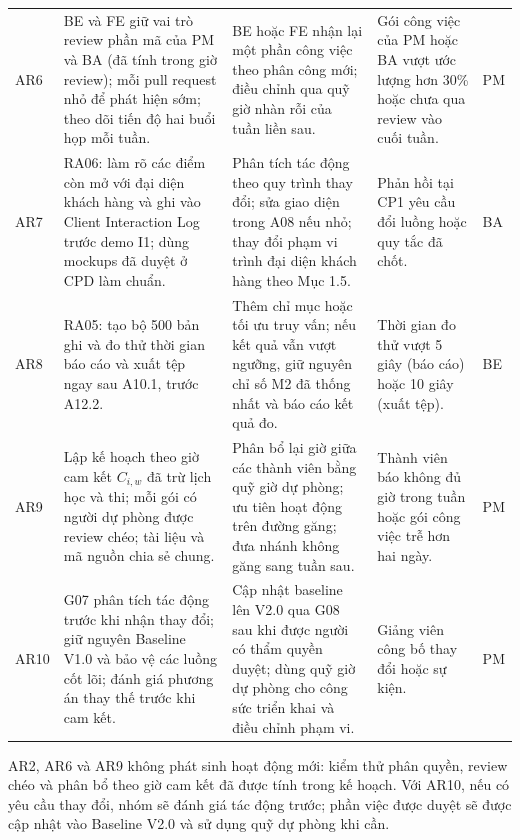 {\begin{longtable}{@{}Y{1.0cm}Y{4.1cm}Y{4.2cm}Y{3.1cm}Y{1.3cm}@{}}
\addlinespace
AR6 &
BE và FE giữ vai trò review phần mã của PM và BA (đã tính trong giờ review); mỗi pull request nhỏ để phát hiện sớm; theo dõi tiến độ hai buổi họp mỗi tuần. &
BE hoặc FE nhận lại một phần công việc theo phân công mới; điều chỉnh qua quỹ giờ nhàn rỗi của tuần liền sau. &
Gói công việc của PM hoặc BA vượt ước lượng hơn 30\% hoặc chưa qua review vào cuối tuần. & PM \\
\addlinespace
AR7 &
RA06: làm rõ các điểm còn mở với đại diện khách hàng và ghi vào Client Interaction Log trước demo I1; dùng mockups đã duyệt ở CPD làm chuẩn. &
Phân tích tác động theo quy trình thay đổi; sửa giao diện trong A08 nếu nhỏ; thay đổi phạm vi trình đại diện khách hàng theo Mục 1.5. &
Phản hồi tại CP1 yêu cầu đổi luồng hoặc quy tắc đã chốt. & BA \\
\addlinespace
AR8 &
RA05: tạo bộ 500 bản ghi và đo thử thời gian báo cáo và xuất tệp ngay sau A10.1, trước A12.2. &
Thêm chỉ mục hoặc tối ưu truy vấn; nếu kết quả vẫn vượt ngưỡng, giữ nguyên chỉ số M2 đã thống nhất và báo cáo kết quả đo. &
Thời gian đo thử vượt 5 giây (báo cáo) hoặc 10 giây (xuất tệp). & BE \\
\addlinespace
AR9 &
Lập kế hoạch theo giờ cam kết $C_{i,w}$ đã trừ lịch học và thi; mỗi gói có người dự phòng được review chéo; tài liệu và mã nguồn chia sẻ chung. &
Phân bổ lại giờ giữa các thành viên bằng quỹ giờ dự phòng; ưu tiên hoạt động trên đường găng; đưa nhánh không găng sang tuần sau. &
Thành viên báo không đủ giờ trong tuần hoặc gói công việc trễ hơn hai ngày. & PM \\
\addlinespace
AR10 &
G07 phân tích tác động trước khi nhận thay đổi; giữ nguyên Baseline V1.0 và bảo vệ các luồng cốt lõi; đánh giá phương án thay thế trước khi cam kết. &
Cập nhật baseline lên V2.0 qua G08 sau khi được người có thẩm quyền duyệt; dùng quỹ giờ dự phòng cho công sức triển khai và điều chỉnh phạm vi. &
Giảng viên công bố thay đổi hoặc sự kiện. & PM \\
\end{longtable}
}

AR2, AR6 và AR9 không phát sinh hoạt động mới: kiểm thử phân quyền, review chéo và phân bổ theo giờ cam kết đã được tính trong kế hoạch. Với AR10, nếu có yêu cầu thay đổi, nhóm sẽ đánh giá tác động trước; phần việc được duyệt sẽ được cập nhật vào Baseline V2.0 và sử dụng quỹ dự phòng khi cần.

